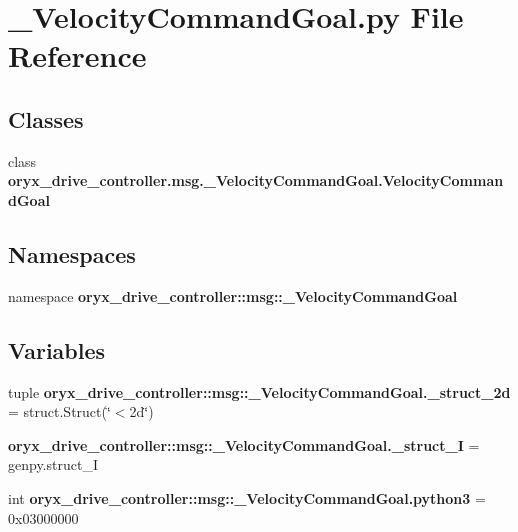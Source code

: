 \section{\-\_\-\-Velocity\-Command\-Goal.\-py \-File \-Reference}
\label{__VelocityCommandGoal_8py}
\subsection*{\-Classes}
\begin{DoxyCompactItemize}
\item 
class {\bf oryx\-\_\-drive\-\_\-controller.\-msg.\-\_\-\-Velocity\-Command\-Goal.\-Velocity\-Command\-Goal}
\end{DoxyCompactItemize}
\subsection*{\-Namespaces}
\begin{DoxyCompactItemize}
\item 
namespace {\bf oryx\-\_\-drive\-\_\-controller\-::msg\-::\-\_\-\-Velocity\-Command\-Goal}
\end{DoxyCompactItemize}
\subsection*{\-Variables}
\begin{DoxyCompactItemize}
\item 
tuple {\bf oryx\-\_\-drive\-\_\-controller\-::msg\-::\-\_\-\-Velocity\-Command\-Goal.\-\_\-struct\-\_\-2d} = struct.\-Struct(\char`\"{}$<$2d\char`\"{})
\item 
{\bf oryx\-\_\-drive\-\_\-controller\-::msg\-::\-\_\-\-Velocity\-Command\-Goal.\-\_\-struct\-\_\-\-I} = genpy.\-struct\-\_\-\-I
\item 
int {\bf oryx\-\_\-drive\-\_\-controller\-::msg\-::\-\_\-\-Velocity\-Command\-Goal.\-python3} = 0x03000000
\end{DoxyCompactItemize}

